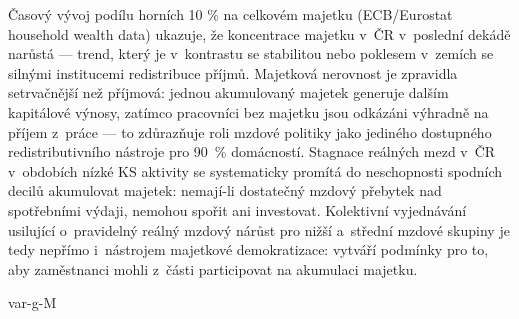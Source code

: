 Časový vývoj podílu horních 10 \% na celkovém majetku (ECB/Eurostat household wealth data) ukazuje, že koncentrace majetku v~ČR v~poslední dekádě narůstá --- trend, který je v~kontrastu se stabilitou nebo poklesem v~zemích se silnými institucemi redistribuce příjmů.
Majetková nerovnost je zpravidla setrvačnější než příjmová: jednou akumulovaný majetek generuje dalším kapitálové výnosy, zatímco pracovníci bez majetku jsou odkázáni výhradně na příjem z~práce --- to zdůrazňuje roli mzdové politiky jako jediného dostupného redistributivního nástroje pro \SI{90}{\percent} domácností.
Stagnace reálných mezd v~ČR v~obdobích nízké \ac{KS} aktivity se systematicky promítá do neschopnosti spodních decilů akumulovat majetek: nemají-li dostatečný mzdový přebytek nad spotřebními výdaji, nemohou spořit ani investovat.
Kolektivní vyjednávání usilující o~pravidelný reálný mzdový nárůst pro nižší a~střední mzdové skupiny je tedy nepřímo i~nástrojem majetkové demokratizace: vytváří podmínky pro to, aby zaměstnanci mohli z~části participovat na akumulaci majetku.

\acs{var-g-M}

